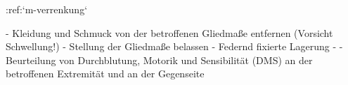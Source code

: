 :ref:`m-verrenkung`
\begin{itemize}
  -   Kleidung und Schmuck von der betroffenen Gliedmaße entfernen 
  (Vorsicht Schwellung!)
  -   Stellung der Gliedmaße belassen
  -   Federnd fixierte Lagerung
  -   
  -   Beurteilung von Durchblutung, Motorik und
  Sensibilität (DMS) an der betroffenen Extremität und an
  der Gegenseite
\end{itemize}